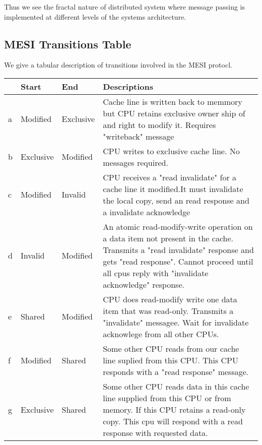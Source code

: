 \documentclass{article}
\begin{document}
Thus we see the fractal nature of distributed system where message
passing is implemented at different levels of the systems
architecture.


\subsection{MESI Transitions Table}

We give a tabular description of transitions involved in the MESI
protocl.


\begin{center}
\begin{tabular*}{0.75\textwidth} {| l | l | l | l| }    
    \hline
    & Start  & End   & Descriptions \\
    \hline
    a & Modified  & Exclusive &
    Cache line is written back to memmory but CPU retains exclusive 
    owner ship of and right to modify it. Requires "writeback" 
    message\\
    \hline
    b& Exclusive & Modified &  
    CPU writes to exclusive cache line. No messages required. \\
    \hline
    c & Modified & Invalid &   
    CPU receives a "read invalidate" for a cache line it modified.It 
    must invalidate the local copy, send an read response and a 
    invalidate acknowledge \\
    \hline
    d & Invalid & Modified &
    An atomic read-modify-write operation on a data item not present
    in the cache. Transmits a "read invalidate" response and gets
    "read response". Cannot proceed until all cpus reply with
    "invalidate acknowledge" response.    \\


    \hline
    e & Shared & Modified & 

    CPU does read-modify write one data item that was
    read-only. Transmits a "invalidate" messagee. Wait for invalidate
    acknowlege from all other CPUs.    


    \\
    \hline
    f & Modified & Shared &

    Some other CPU reads from our cache line suplied from this
    CPU. This CPU responds with a "read response" message.    
    \\    
    \hline

    g & Exclusive & Shared & 

    Some other CPU reads data in this cache line supplied from this
    CPU or from memory. If this CPU retains a read-only copy. This cpu
    will respond with a read response with requested data.
    

\end{tabular*}
\end{center}
\end{document}

